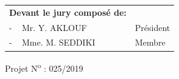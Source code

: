 \documentclass[12pt , a4paper]{report}
\begin{document}
	\vspace*{0.5cm}
	
	\begin{table}[h]
		\begin{tabular}{p{6.5cm}p{5cm}}
			\textbf{Devant le jury composé de:}&\\
			- \,\,\, Mr.  Y. AKLOUF & Président \\
			- \,\,\, Mme. M. SEDDIKI & Membre \\
		\end{tabular}
	\end{table}
	\vspace*{2.3cm}
	\begin{center}
		Projet N\textsuperscript{o} : 025/2019
	\end{center}
\end{document}
